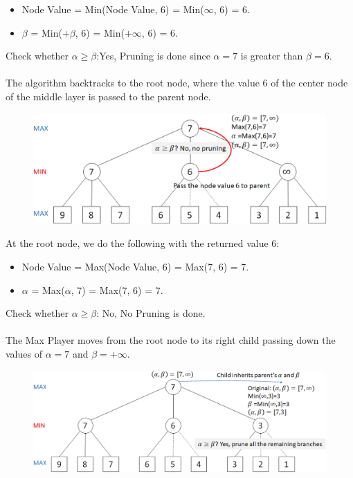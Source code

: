 \documentclass{book}
\begin{document}
\begin{itemize}
    \item Node Value = Min(Node Value, 6) = Min($\infty$, 6) = 6.
    \item $\beta$ = Min($+\beta$, 6) = Min($+\infty$, 6) = 6.
\end{itemize}
Check whether $\alpha \geq \beta$:Yes, Pruning is done since $\alpha = 7$ is greater than $\beta = 6$.\\
\vspace{1.2cm}
\\
The algorithm backtracks to the root node, where the value 6 of the center node of the middle layer is passed to the parent node.\\
\begin{figure}
    \includegraphics[scale=0.09]{chapter 10/ch10_figure9.jpeg}
\end{figure}
At the root node, we do the following with the returned value 6:
\begin{itemize}
    \item Node Value = Max(Node Value, 6) = Max(7, 6) = 7.
    \item $\alpha$ = Max($\alpha$, 7) = Max(7, 6) = 7.
\end{itemize}
Check whether $\alpha \geq \beta$: No, No Pruning is done.\\
\vspace{1.2cm}
\\
The Max Player moves from the root node to its right child passing down the values of $\alpha = 7$ and $\beta = +\infty$.\\
\begin{figure}
    \includegraphics[scale=0.09]{chapter 10/ch10_figure10.jpeg}
\end{figure}
\end{document}
